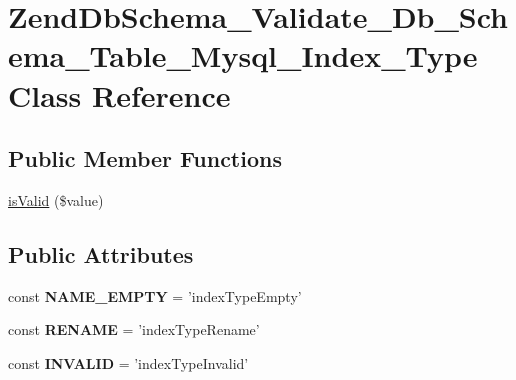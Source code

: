 \hypertarget{classZendDbSchema__Validate__Db__Schema__Table__Mysql__Index__Type}{\section{\-Zend\-Db\-Schema\-\_\-\-Validate\-\_\-\-Db\-\_\-\-Schema\-\_\-\-Table\-\_\-\-Mysql\-\_\-\-Index\-\_\-\-Type \-Class \-Reference}
\label{classZendDbSchema__Validate__Db__Schema__Table__Mysql__Index__Type}
}
\subsection*{\-Public \-Member \-Functions}
\begin{DoxyCompactItemize}
\item 
\hyperlink{classZendDbSchema__Validate__Db__Schema__Table__Mysql__Index__Type_ae51b8f5ac372f81546ed0f1cb2cfb070}{is\-Valid} (\$value)
\end{DoxyCompactItemize}
\subsection*{\-Public \-Attributes}
\begin{DoxyCompactItemize}
\item 
\hypertarget{classZendDbSchema__Validate__Db__Schema__Table__Mysql__Index__Type_a2882546b09ea10812ddb287f8db198b1}{const {\bfseries \-N\-A\-M\-E\-\_\-\-E\-M\-P\-T\-Y} = 'index\-Type\-Empty'}\label{classZendDbSchema__Validate__Db__Schema__Table__Mysql__Index__Type_a2882546b09ea10812ddb287f8db198b1}

\item 
\hypertarget{classZendDbSchema__Validate__Db__Schema__Table__Mysql__Index__Type_a228b5501ef24eb2da13c213f4b0a6f27}{const {\bfseries \-R\-E\-N\-A\-M\-E} = 'index\-Type\-Rename'}\label{classZendDbSchema__Validate__Db__Schema__Table__Mysql__Index__Type_a228b5501ef24eb2da13c213f4b0a6f27}

\item 
\hypertarget{classZendDbSchema__Validate__Db__Schema__Table__Mysql__Index__Type_a3c4583ffce11d24d19b795507a86625a}{const {\bfseries \-I\-N\-V\-A\-L\-I\-D} = 'index\-Type\-Invalid'}\label{classZendDbSchema__Validate__Db__Schema__Table__Mysql__Index__Type_a3c4583ffce11d24d19b795507a86625a}

\end{DoxyCompactItemize}
